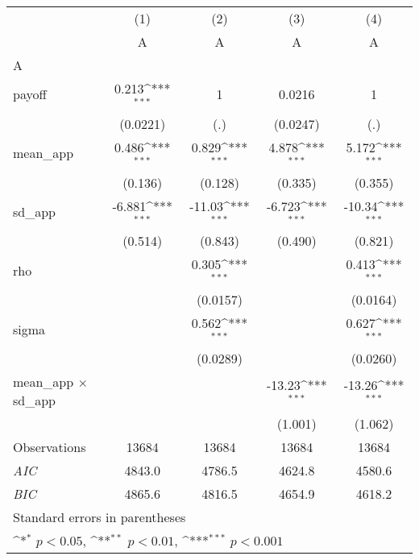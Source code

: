{
\def\sym#1{\ifmmode^{#1}\else\(^{#1}\)\fi}
\begin{tabular}{l*{4}{c}}
\hline\hline
                    &\multicolumn{1}{c}{(1)}&\multicolumn{1}{c}{(2)}&\multicolumn{1}{c}{(3)}&\multicolumn{1}{c}{(4)}\\
                    &\multicolumn{1}{c}{A}&\multicolumn{1}{c}{A}&\multicolumn{1}{c}{A}&\multicolumn{1}{c}{A}\\
\hline
A                   &                     &                     &                     &                     \\
payoff              &       0.213\sym{***}&           1         &      0.0216         &           1         \\
                    &    (0.0221)         &         (.)         &    (0.0247)         &         (.)         \\
[1em]
mean\_app            &       0.486\sym{***}&       0.829\sym{***}&       4.878\sym{***}&       5.172\sym{***}\\
                    &     (0.136)         &     (0.128)         &     (0.335)         &     (0.355)         \\
[1em]
sd\_app              &      -6.881\sym{***}&      -11.03\sym{***}&      -6.723\sym{***}&      -10.34\sym{***}\\
                    &     (0.514)         &     (0.843)         &     (0.490)         &     (0.821)         \\
[1em]
rho                 &                     &       0.305\sym{***}&                     &       0.413\sym{***}\\
                    &                     &    (0.0157)         &                     &    (0.0164)         \\
[1em]
sigma               &                     &       0.562\sym{***}&                     &       0.627\sym{***}\\
                    &                     &    (0.0289)         &                     &    (0.0260)         \\
[1em]
mean\_app $\times$ sd\_app&                     &                     &      -13.23\sym{***}&      -13.26\sym{***}\\
                    &                     &                     &     (1.001)         &     (1.062)         \\
\hline
Observations        &       13684         &       13684         &       13684         &       13684         \\
\textit{AIC}        &      4843.0         &      4786.5         &      4624.8         &      4580.6         \\
\textit{BIC}        &      4865.6         &      4816.5         &      4654.9         &      4618.2         \\
\hline\hline
\multicolumn{5}{l}{\footnotesize Standard errors in parentheses}\\
\multicolumn{5}{l}{\footnotesize \sym{*} \(p<0.05\), \sym{**} \(p<0.01\), \sym{***} \(p<0.001\)}\\
\end{tabular}
}
